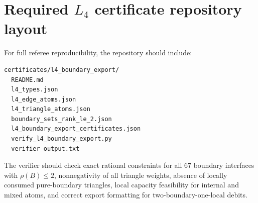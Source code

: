 \documentclass[11pt]{article}
\theoremstyle{definition}
\begin{document}
\appendix

\section{Required \(L_4\) certificate repository layout}

For full referee reproducibility, the repository should include:
\begin{verbatim}
certificates/l4_boundary_export/
  README.md
  l4_types.json
  l4_edge_atoms.json
  l4_triangle_atoms.json
  boundary_sets_rank_le_2.json
  l4_boundary_export_certificates.json
  verify_l4_boundary_export.py
  verifier_output.txt
\end{verbatim}

The verifier should check exact rational constraints for all \(67\) boundary interfaces with \(\rho(B)\le2\), nonnegativity of all triangle weights, absence of locally consumed pure-boundary triangles, local capacity feasibility for internal and mixed atoms, and correct export formatting for two-boundary-one-local debits.
\end{document}
